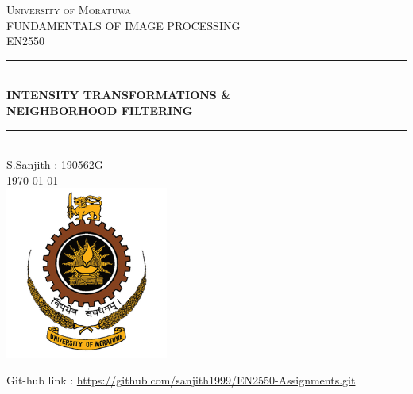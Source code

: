 \documentclass[12pt,a4paper]{article}
\begin{document}
\begin{titlepage}

    \newcommand{\HRule}{\rule{\linewidth}{0.5mm}} 							%
    \center

    \textsc{\LARGE University of Moratuwa}\\[1cm]

    \textsc{\Large FUNDAMENTALS OF IMAGE PROCESSING}\\[0.2cm]
    \textsc{\large EN2550}\\[1cm] 										%
    \HRule \\[0.8cm]
    { \Large \bfseries  INTENSITY TRANSFORMATIONS \& \\ [0.3cm]NEIGHBORHOOD FILTERING}\\[0.7cm]
    \HRule \\[2cm]
    \large
    S.Sanjith : 190562G\\[1.5cm]
    {\large \today}\\[2cm]
    \includegraphics[width=0.4\textwidth]{mora.png}\\[1cm] 	%
    \vfill
\end{titlepage}

\newpage
\tableofcontents
\vspace{12cm}
Git-hub link : \url{https://github.com/sanjith1999/EN2550-Assignments.git}
\newpage
\end{document}
